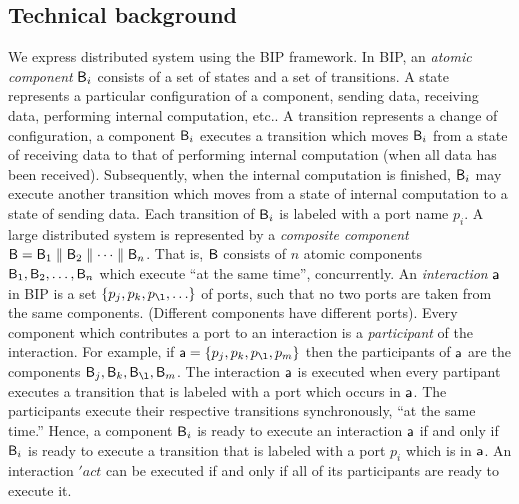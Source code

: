 

\subsection{Technical background}

We express distributed system using the BIP \cite{bip06,BliudzeS08} framework. In BIP, an \emph{atomic component} $\mathsf{B}_i$ consists of a set of states and a set of
transitions. A state represents a particular configuration of a component, \eg sending data, receiving data, performing internal computation, etc..
A transition represents a change of configuration, \eg a component $\mathsf{B}_i$ executes a transition which moves $\mathsf{B}_i$ from a 
state of receiving data to that of performing internal computation (\eg when all data has been received). Subsequently, when the internal computation
is finished, $\mathsf{B}_i$ may execute another transition which moves from a state of internal computation to a state of sending data.
Each transition of $\mathsf{B}_i$ is labeled with a port name $p_i$. 
A large distributed system is represented by a \emph{composite component} $\mathsf{B} = \mathsf{B}_1 \parallel \mathsf{B}_2 \parallel \cdots \parallel \mathsf{B}_n$. That is, $\mathsf{B}$ consists of $n$
atomic components $\mathsf{B}_1, \mathsf{B}_2,  \ldots,  \mathsf{B}_n$ which execute ``at the same time'', \ie concurrently. 
An \emph{interaction} $\mathsf{a}$ in BIP is a set $\{ p_j, p_k, p_{\l}, \ldots \}$ of ports, such that no two ports are taken from the same components.
(Different components have different ports). Every component which contributes a port to an interaction is a \emph{participant} of the interaction.
For example, if  $\act = \{ p_j, p_k, p_{\l}, p_m \}$ then the participants of $\mathsf{a}$ are the components $\B_j, \B_k, \B_{\l}, \B_m$.
The interaction $\mathsf{a}$ is executed when every partipant executes a transition that is labeled with a port which occurs in $\mathsf{a}$. 
The participants execute their respective transitions synchronously,
\ie ``at the same time.'' 
%
Hence, a component $\mathsf{B}_i$ is ready to execute an interaction $\mathsf{a}$
if and only if $\mathsf{B}_i$ is ready to execute a transition that is labeled
with a port $p_i$ which is in $\mathsf{a}$.
An interaction $'act$ can be executed if and only if all of its
participants are ready to execute it.